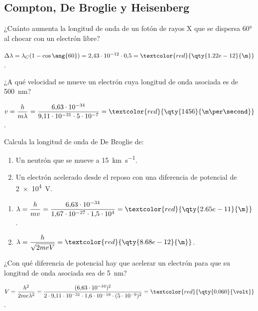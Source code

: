 \subsection{Compton, De Broglie y Heisenberg}

\begin{exercise}
    ¿Cuánto aumenta la longitud de onda de un fotón de rayos X que se dispersa \ang{60} al chocar con un electrón libre?
    \begin{solu}
        \(\Delta\lambda = \lambda_C(1 - \cos\ang{60}) = 2{,}43\cdot 10^{-12}\cdot 0{,}5 = \textcolor{red}{\qty{1.22e-12}{\m}}\).
    \end{solu}
\end{exercise}

\begin{exercise}
    ¿A qué velocidad se mueve un electrón cuya longitud de onda asociada es de \qty{500}{\nm}?
    \begin{solu}
        \(v = \dfrac{h}{m\lambda} = \dfrac{6{,}63\cdot 10^{-34}}{9{,}11\cdot 10^{-31}\cdot 5\cdot 10^{-7}} = \textcolor{red}{\qty{1456}{\m\per\second}}\).
    \end{solu}
\end{exercise}

\begin{exercise}
    Calcula la longitud de onda de De Broglie de:
    \begin{enumerate}[label=\letraminuscula]
        \item Un neutrón que se mueve a \qty{15}{\km\per\second}.
        \item Un electrón acelerado desde el reposo con una diferencia de potencial de \qty{2e4}{\volt}.
    \end{enumerate}
    \begin{solu}
        \begin{enumerate}[label=\letraminuscula]
            \item \(\lambda = \dfrac{h}{mv} = \dfrac{6{,}63\cdot 10^{-34}}{1{,}67\cdot 10^{-27}\cdot 1{,}5\cdot 10^4} = \textcolor{red}{\qty{2.65e-11}{\m}}\).
            \item \(\lambda = \dfrac{h}{\sqrt{2 m e V}} = \textcolor{red}{\qty{8.68e-12}{\m}}\).
        \end{enumerate}
    \end{solu}
\end{exercise}

\begin{exercise}
    ¿Con qué diferencia de potencial hay que acelerar un electrón para que su longitud de onda asociada sea de \qty{5}{\nm}?
    \begin{solu}
        \(V = \dfrac{h^2}{2 m e\lambda^2} = \dfrac{(6{,}63\cdot 10^{-34})^2}{2\cdot 9{,}11\cdot 10^{-31}\cdot 1{,}6\cdot 10^{-19}\cdot(5\cdot 10^{-9})^2} = \textcolor{red}{\qty{0.060}{\volt}}\).
    \end{solu}
\end{exercise}

